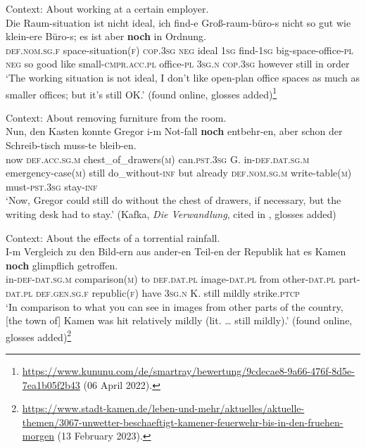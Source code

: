 \begin{exe}
	\ex\label{exAppendixGermanMarginal1}
	Context: About working at a certain employer. \\
	\gll Die Raum-situation ist nicht ideal, ich find-e Groß-raum-büro-s nicht so gut wie klein-ere Büro-s; es ist aber \textbf{noch} in Ordnung.\\
	\textsc{def}.\textsc{nom}.\textsc{sg}.\textsc{f} space-situation(\textsc{f}) \textsc{cop}.3\textsc{sg} \textsc{neg} ideal 1\textsc{sg} find-1\textsc{sg} big-space-office-\textsc{pl} \textsc{neg} so good like small-\textsc{cmpr}.\textsc{acc}.\textsc{pl} office-\textsc{pl} 3\textsc{sg}.\textsc{n} \textsc{cop}.3\textsc{sg} however still in order\\
	\glt \lq The working situation is not ideal, I don't like open-plan office spaces as much as smaller offices; but it's still OK.' (found online, glosses added)\footnote{\url{https://www.kununu.com/de/smartray/bewertung/9cdecae8-9a66-476f-8d5e-7ea1b05f2b43} (06 April 2022).}

	\ex\label{exAppendixGermanMarginal2}
	Context: About removing furniture from the room.\\
	\gll Nun, den Kasten konnte Gregor i-m Not-fall \textbf{noch} entbehr-en, aber schon der Schreib-tisch muss-te bleib-en.\\
	now \textsc{def}.\textsc{acc}.\textsc{sg}.\textsc{m} chest\_of\_drawers(\textsc{m}) can.\textsc{pst}.3\textsc{sg} G. in-\textsc{def}.\textsc{dat}.\textsc{sg}.\textsc{m} emergency-case(\textsc{m}) still do\_without-\textsc{inf} but already \textsc{def}.\textsc{nom}.\textsc{sg}.\textsc{m} write-table(\textsc{m}) must-\textsc{pst}.3\textsc{sg} stay-\textsc{inf}\\
	\glt \lq Now, Gregor could still do without the chest of drawers, if necessary, but the writing desk had to stay.' (Kafka, \textit{Die Verwandlung}, cited in \cite[546]{Shetter1966}, glosses added)
	
	\ex\label{exAppendixGermanMarginal3}
Context: About the effects of a torrential rainfall.\\
	\gll I-m Vergleich zu den Bild-ern aus ander-en Teil-en der Republik hat es Kamen \textbf{noch} glimpflich getroffen.\\
	in-\textsc{def}-\textsc{dat}.\textsc{sg}.\textsc{m} comparison(\textsc{m}) to \textsc{def}.\textsc{dat}.\textsc{pl} image-\textsc{dat}.\textsc{pl} from other-\textsc{dat}.\textsc{pl} part-\textsc{dat}.\textsc{pl} \textsc{def}.\textsc{gen}.\textsc{sg}.\textsc{f} republic(\textsc{f}) have 3\textsc{sg}.\textsc{n} K. still mildly strike.\textsc{ptcp}\\
	\glt \lq In comparison to what you can see in images from other parts of the country, [the town of] Kamen was hit relatively mildly (lit. … still mildly).\rq{ }(found online, glosses added)\footnote{\url{https://www.stadt-kamen.de/leben-und-mehr/aktuelles/aktuelle-themen/3067-unwetter-beschaeftigt-kamener-feuerwehr-bis-in-den-fruehen-morgen} (13 February 2023).}


\end{exe}
